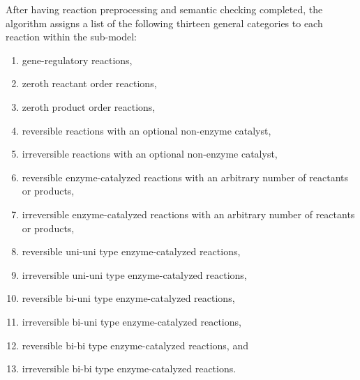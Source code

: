 After having reaction preprocessing and semantic checking completed, the algorithm assigns a list of the following thirteen general categories to each reaction within the sub-model:\\
\noindent
\begin{minipage}[t]{.5\textwidth}
\raggedleft
\begin{enumerate}
  \item gene-regulatory reactions,
  \item zeroth reactant order reactions,
  \item zeroth product order reactions,
  \item reversible reactions with an optional non-enzyme catalyst,
  \item irreversible reactions with an optional non-enzyme catalyst,
  \item reversible enzyme-catalyzed reactions with an arbitrary number of reactants or products,
  \item irreversible enzyme-catalyzed reactions with an arbitrary number of reactants or products,
\end{enumerate}
\end{minipage}%
\begin{minipage}[t]{.5\textwidth}
\raggedleft
\begin{enumerate}
  \setcounter{enumi}{7}
  \item reversible uni-uni type enzyme-catalyzed reactions,
  \item irreversible uni-uni type enzyme-catalyzed reactions,
  \item reversible bi-uni type enzyme-catalyzed reactions,
  \item irreversible bi-uni type enzyme-catalyzed reactions,
  \item reversible bi-bi type enzyme-catalyzed reactions, and
  \item irreversible bi-bi type enzyme-catalyzed reactions.
\end{enumerate}
\end{minipage}\\[1em]
